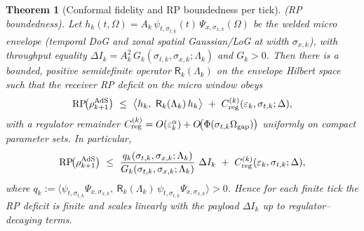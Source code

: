 \documentclass[10pt]{article}
\theoremstyle{definition}
\theoremstyle{plain}
\newtheorem{theorem}{Theorem}[section]
\begin{document}
\begin{theorem}[Conformal fidelity and RP boundedness per tick]
\smallskip
\emph{(RP boundedness).}
Let $h_k(t,\Omega)=A_k\,\psi_{t,\sigma_{t,k}}(t)\,\Psi_{x,\sigma_{x,k}}(\Omega)$ be the welded micro envelope (temporal DoG and zonal spatial Gaussian/LoG at width $\sigma_{x,k}$), with throughput equality
$\Delta I_k=A_k^2\,G_k(\sigma_{t,k},\sigma_{x,k};\Lambda_k)$ and $G_k>0$. Then there is a bounded, positive semidefinite operator $\mathsf R_k(\Lambda_k)$ on the envelope Hilbert space such that the receiver RP deficit on the micro window obeys
\begin{equation}\label{eq:RP-bound}
\mathrm{RP}\!\big(\rho_{k+1}^{\rm AdS}\big)\ \le\ \big\langle h_k,\ \mathsf R_k(\Lambda_k)\,h_k\big\rangle\ +\ C_{\rm reg}^{(k)}(\varepsilon_k,\sigma_{t,k};\Delta),
\end{equation}
with a regulator remainder $C_{\rm reg}^{(k)}=O(\varepsilon_k^\alpha)+O\!\big(\Phi(\sigma_{t,k}\Omega_{\rm gap})\big)$ uniformly on compact parameter sets. In particular,
\begin{equation}\label{eq:RP-bound-DeltaI}
\mathrm{RP}\!\big(\rho_{k+1}^{\rm AdS}\big)\ \le\ \frac{q_k(\sigma_{t,k},\sigma_{x,k};\Lambda_k)}{G_k(\sigma_{t,k},\sigma_{x,k};\Lambda_k)}\ \Delta I_k\ +\ C_{\rm reg}^{(k)}(\varepsilon_k,\sigma_{t,k};\Delta),
\end{equation}
where $q_k:=\langle \psi_{t,\sigma_{t,k}}\Psi_{x,\sigma_{x,k}},\ \mathsf R_k(\Lambda_k)\,\psi_{t,\sigma_{t,k}}\Psi_{x,\sigma_{x,k}}\rangle>0$. Hence for each finite tick the RP deficit is finite and scales linearly with the payload $\Delta I_k$ up to regulator--decaying terms.
\end{theorem}
\end{document}
